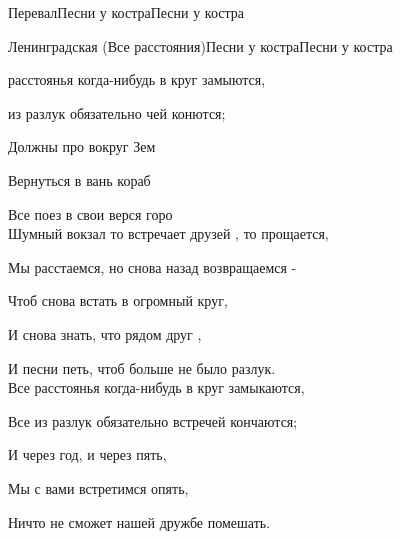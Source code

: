 \documentclass[11pt,a5paper]{book}
\begin{document}
\begin{song}{Перевал}{}{Песни у костра}{Песни у костра}{}{}
\begin{SBSection*}
\begin{figure}[b!]
\end{figure}
\end{SBSection*}

\end{song}

\begin{song}{Ленинградская (Все расстояния)}{}{Песни у костра}{Песни у костра}{}{}

 расстоянья когда-нибудь в круг замыются,\par
{} из разлук обязательно чей конются;\par
Должны про вокруг Зем\par
Вернуться в вань кораб\par   
Все поез в свои верся горо\\
 
Шумный вокзал то встречает друзей , то прощается,\par
Мы расстаемся, но снова назад возвращаемся -\par
Чтоб снова встать в огромный круг,\par
И снова знать, что рядом друг ,\par
И песни петь, чтоб больше не было разлук.\\
 
Все расстоянья когда-нибудь в круг замыкаются,\par
Все из разлук обязательно встречей кончаются;\par
И через год, и через пять,\par
Мы с вами встретимся опять,\par
Ничто не сможет нашей дружбе помешать.\par

\end{song}
\end{document}
